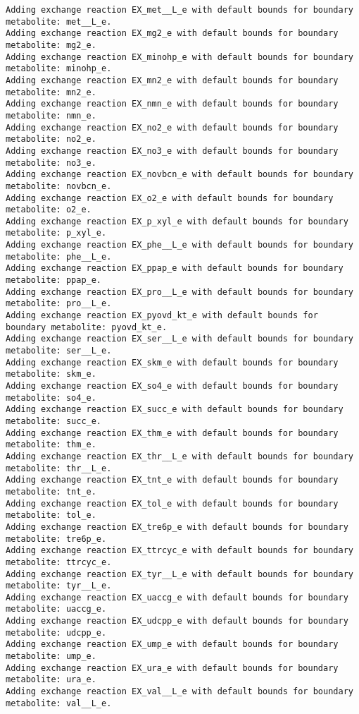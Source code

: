 \documentclass[
  letterpaper,
  DIV=11,
  numbers=noendperiod]{scrartcl}
\begin{document}
\begin{verbatim}
Adding exchange reaction EX_met__L_e with default bounds for boundary metabolite: met__L_e.
Adding exchange reaction EX_mg2_e with default bounds for boundary metabolite: mg2_e.
Adding exchange reaction EX_minohp_e with default bounds for boundary metabolite: minohp_e.
Adding exchange reaction EX_mn2_e with default bounds for boundary metabolite: mn2_e.
Adding exchange reaction EX_nmn_e with default bounds for boundary metabolite: nmn_e.
Adding exchange reaction EX_no2_e with default bounds for boundary metabolite: no2_e.
Adding exchange reaction EX_no3_e with default bounds for boundary metabolite: no3_e.
Adding exchange reaction EX_novbcn_e with default bounds for boundary metabolite: novbcn_e.
Adding exchange reaction EX_o2_e with default bounds for boundary metabolite: o2_e.
Adding exchange reaction EX_p_xyl_e with default bounds for boundary metabolite: p_xyl_e.
Adding exchange reaction EX_phe__L_e with default bounds for boundary metabolite: phe__L_e.
Adding exchange reaction EX_ppap_e with default bounds for boundary metabolite: ppap_e.
Adding exchange reaction EX_pro__L_e with default bounds for boundary metabolite: pro__L_e.
Adding exchange reaction EX_pyovd_kt_e with default bounds for boundary metabolite: pyovd_kt_e.
Adding exchange reaction EX_ser__L_e with default bounds for boundary metabolite: ser__L_e.
Adding exchange reaction EX_skm_e with default bounds for boundary metabolite: skm_e.
Adding exchange reaction EX_so4_e with default bounds for boundary metabolite: so4_e.
Adding exchange reaction EX_succ_e with default bounds for boundary metabolite: succ_e.
Adding exchange reaction EX_thm_e with default bounds for boundary metabolite: thm_e.
Adding exchange reaction EX_thr__L_e with default bounds for boundary metabolite: thr__L_e.
Adding exchange reaction EX_tnt_e with default bounds for boundary metabolite: tnt_e.
Adding exchange reaction EX_tol_e with default bounds for boundary metabolite: tol_e.
Adding exchange reaction EX_tre6p_e with default bounds for boundary metabolite: tre6p_e.
Adding exchange reaction EX_ttrcyc_e with default bounds for boundary metabolite: ttrcyc_e.
Adding exchange reaction EX_tyr__L_e with default bounds for boundary metabolite: tyr__L_e.
Adding exchange reaction EX_uaccg_e with default bounds for boundary metabolite: uaccg_e.
Adding exchange reaction EX_udcpp_e with default bounds for boundary metabolite: udcpp_e.
Adding exchange reaction EX_ump_e with default bounds for boundary metabolite: ump_e.
Adding exchange reaction EX_ura_e with default bounds for boundary metabolite: ura_e.
Adding exchange reaction EX_val__L_e with default bounds for boundary metabolite: val__L_e.

\end{verbatim}
\end{document}
